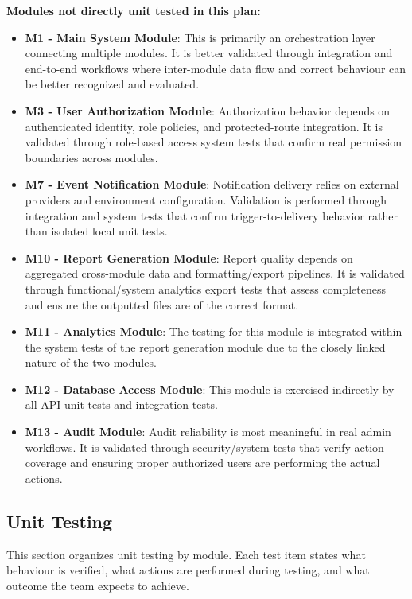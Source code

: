 \documentclass[12pt, titlepage]{article}
\begin{document}
\textbf{Modules not directly unit tested in this plan:}
\begin{itemize}
  \item \textbf{M1 - Main System Module}: This is primarily an orchestration layer connecting multiple modules. It is better validated through integration and end-to-end workflows where inter-module data flow and correct behaviour can be better recognized and evaluated.
  \item \textbf{M3 - User Authorization Module}: Authorization behavior depends on authenticated identity, role policies, and protected-route integration. It is validated through role-based access system tests that confirm real permission boundaries across modules.
  \item \textbf{M7 - Event Notification Module}: Notification delivery relies on external providers and environment configuration. Validation is performed through integration and system tests that confirm trigger-to-delivery behavior rather than isolated local unit tests.
  \item \textbf{M10 - Report Generation Module}: Report quality depends on aggregated cross-module data and formatting/export pipelines. It is validated through functional/system analytics export tests that assess completeness and ensure the outputted files are of the correct format.
  \item \textbf{M11 - Analytics Module}: The testing for this module is integrated within the system tests of the report generation module due to the closely linked nature of the two modules.
  \item \textbf{M12 - Database Access Module}: This module is exercised indirectly by all API unit tests and integration tests.
  \item \textbf{M13 - Audit Module}: Audit reliability is most meaningful in real admin workflows. It is validated through security/system tests that verify action coverage and ensuring proper authorized users are performing the actual actions.
\end{itemize}

\subsection{Unit Testing}
This section organizes unit testing by module. Each test item states what behaviour is verified, what actions are performed during testing, and what outcome the team expects to achieve.\\
\end{document}
